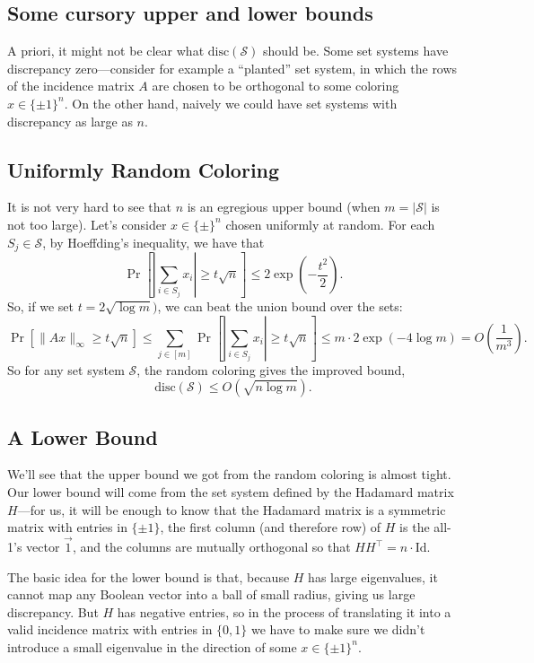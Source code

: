 \documentclass{article}
\theoremstyle{theorem}
\theoremstyle{definition}
\newcommand{\disc}{\mathrm{disc}}
\newcommand{\cS}{\mathcal{S}}
\newcommand{\Id}{\mathrm{Id}}
\begin{document}
\subsection*{Some cursory upper and lower bounds}
A priori, it might not be clear what $\disc(\cS)$ should be.
Some set systems have discrepancy zero---consider for example a ``planted'' set system, in which the rows of the incidence matrix $A$ are chosen to be orthogonal to some coloring $x\in \{\pm 1\}^n$.
On the other hand, naively we could have set systems with discrepancy as large as $n$.

\subsection*{Uniformly Random Coloring}
It is not very hard to see that $n$ is an egregious upper bound (when $m = |\cS|$ is not too large).
Let's consider $x \in \{\pm\}^n$ chosen uniformly at random.
For each $S_j \in \cS$, by Hoeffding's inequality, we have that
\[
    \Pr\left[\left|\sum_{i \in S_j} x_i \right| \ge t \sqrt{n} \right] \le 2\exp\left(-\frac{t^2}{2}\right).
\]
So, if we set $t = 2\sqrt{\log m})$, we can beat the union bound over the sets:
\[
    \Pr[\|Ax\|_{\infty} \ge t\sqrt{n}]
    \le \sum_{j \in [m]} \Pr\left[\left|\sum_{i \in S_j} x_i \right| \ge t\sqrt{n} \right]
    \le m \cdot 2\exp(-4 \log m) = O\left(\frac{1}{m^3}\right).
\]
So for any set system $\cS$, the random coloring gives the improved bound,
\begin{equation}
    \disc(\cS) \le O(\sqrt{n\log m}).\label{randomub}
\end{equation}

\subsection*{A Lower Bound}
We'll see that the upper bound we got from the random coloring is almost tight.
Our lower bound will come from the set system defined by the
Hadamard matrix %
 $H$---for us, it will be enough to know that the Hadamard matrix is a symmetric matrix with entries in $\{\pm 1\}$,  the first column (and therefore row) of $H$ is the all-1's vector $\vec{1}$, and the columns are mutually orthogonal so that $HH^{\top} = n\cdot \Id$.

The basic idea for the lower bound is that, because $H$ has large eigenvalues, it cannot map any Boolean vector into a ball of small radius, giving us large discrepancy.
But $H$ has negative entries, so in the process of translating it into a valid incidence matrix with entries in $\{0,1\}$ we have to make sure we didn't introduce a small eigenvalue in the direction of some $x \in \{\pm 1\}^n$.
\end{document}
